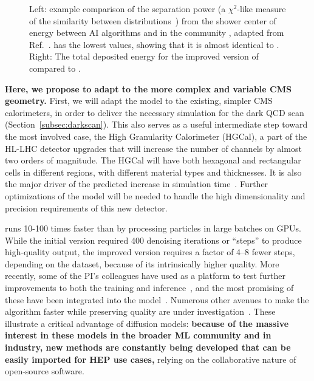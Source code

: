 \begin{figure}[htb!]
\centering
{}
\caption{Left: example comparison of the separation power (a $\chi^2$-like measure of the similarity between distributions~\cite{Diefenbacher:2020rna})
from the shower center of energy between AI algorithms and \GEANTfour in the community \challenge, adapted from Ref.~\cite{Krause:2023mlj}.
\diffu has the lowest values, showing that it is almost identical to \GEANTfour.
Right: The total deposited energy for the improved version of \diffu compared to \GEANTfour.}
\label{fig:calodiffu}
\end{figure}

\textbf{Here, we propose to adapt \diffu to the more complex and variable CMS geometry.}
First, we will adapt the model to the existing, simpler CMS calorimeters,
in order to deliver the necessary simulation for the dark QCD scan (Section~\ref{subsec:darkscan}).
This also serves as a useful intermediate step toward the most involved case,
the High Granularity Calorimeter (HGCal), a part of the HL-LHC detector upgrades
that will increase the number of channels by almost two orders of magnitude.
The HGCal will have both hexagonal and rectangular cells in different regions, with different material types and thicknesses.
It is also the major driver of the predicted increase in \GEANTfour simulation time~\cite{Pedro:2020kbk}.
Further optimizations of the \diffu model will be needed to handle the high dimensionality and precision requirements of this new detector.

\diffu runs 10-100 times faster than \GEANTfour by processing particles in large batches on GPUs.
While the initial version required 400 denoising iterations or ``steps'' to produce high-quality output,
the improved version requires a factor of 4--8 fewer steps, depending on the dataset, because of its intrinsically higher quality.
More recently, some of the PI's colleagues have used \diffu as a platform to test further improvements to both the training and inference~\cite{Jiang:2024ohg},
and the most promising of these have been integrated into the model~\cite{Amram:GitHub}.
Numerous other avenues to make the algorithm faster while preserving quality are under investigation~\cite{Rombach:2022,Song:2023,Mei:2023}.
These illustrate a critical advantage of diffusion models:
\textbf{because of the massive interest in these models in the broader ML community and in industry,
new methods are constantly being developed that can be easily imported for HEP use cases,}
relying on the collaborative nature of open-source software.

